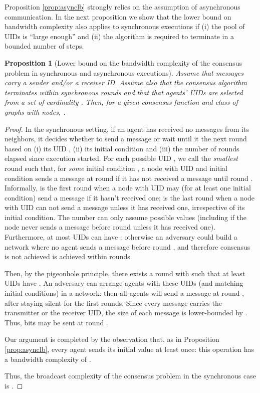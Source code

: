 \documentclass[letterpaper,10pt,conference]{ieeeconf}
\newtheorem{proposition}[theorem]{Proposition}
\begin{document}
 Proposition \ref{prop:asynclb} strongly relies on the assumption of asynchronous communication. In the next proposition we show that the lower bound on bandwidth complexity also applies to synchronous executions if (i) the pool of UIDs is ``large enough'' and (ii) the algorithm is required to terminate in a bounded number of steps.
 
 \begin{proposition}[Lower bound on the bandwidth complexity of the consensus problem in synchronous and asynchronous executions]
\label{prop:synclb}
Assume that messages carry a sender and/or a receiver ID. Assume also that the consensus algorithm terminates within  synchronous rounds and that  that agents' UIDs are selected from a set  of cardinality .  Then, for a given consensus function  and class of graphs  with  nodes,  .
\end{proposition}
\begin{proof}
In the synchronous setting, if an agent has received no messages from its neighbors, it decides whether to send a message or wait until it the next round based on (i) its UID , (ii) its initial condition  and (iii) the number of rounds  elapsed since execution started. For each possible UID , we call  the \emph{smallest} round such that, for \emph{some} initial condition , a node with UID  and initial condition  sends a message at round  if it has not received a message until round . Informally,  is the first round when a node with UID  may (for at least one initial condition) send a message if it hasn't received one;  is the last round when a node with UID  can not send a message unless it has received one, irrespective of its initial condition.
The number  can only assume  possible values (including  if the node never sends a message before round  unless it has received one). Furthermore, at most  UIDs can have : otherwise an adversary could build a network where no agent sends a message before round , and therefore consensus is not achieved is achieved within  rounds.

Then, by the pigeonhole principle, there exists a round  with  such that at least  UIDs have . An adversary can arrange agents with these UIDs (and matching initial conditions) in a network: then all  agents will send a message at round , after staying silent for the first  rounds. Since every message carries the transmitter or the receiver UID, the size of each message is lower-bounded by . Thus,   bits may be sent at round .

Our argument is completed by the observation that, as in Proposition \ref{prop:asynclb}, every agent sends its initial value at least once: this operation has a bandwidth complexity of .

Thus, the broadcast complexity of the consensus problem in the synchronous case is .
\end{proof}
\end{document}
